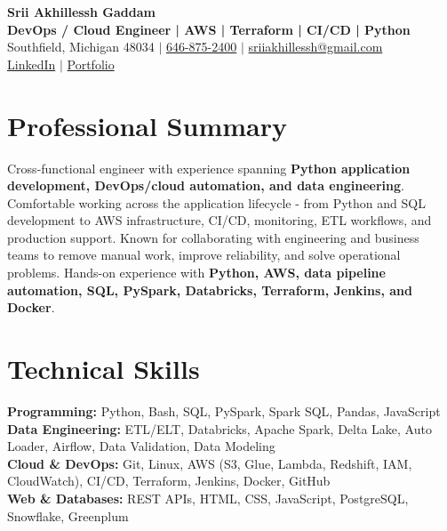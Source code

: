 \documentclass[letterpaper,10pt]{article}
\begin{document}
\fontsize{9.35pt}{10.45pt}\selectfont

\begin{center}
    {\LARGE \textbf{Srii Akhillessh Gaddam}} \\[-1pt]
    \textbf{DevOps / Cloud Engineer | AWS | Terraform | CI/CD | Python} \\[2pt]
    Southfield, Michigan 48034 $|$
    \href{tel:6468752400}{646-875-2400} $|$
    \href{mailto:sriiakhillessh@gmail.com}{sriiakhillessh@gmail.com} \\[1pt]
    \href{https://www.linkedin.com/in/srii-akhiilessh-gaddam-b48668191/}{LinkedIn} $|$
    \href{https://sriiakhillesshg.github.io/portfolio/}{Portfolio}
\end{center}
\vspace{-8pt}

\section{Professional Summary}
\small{Cross-functional engineer with experience spanning \textbf{Python application development, DevOps/cloud automation, and data engineering}. Comfortable working across the application lifecycle - from Python and SQL development to AWS infrastructure, CI/CD, monitoring, ETL workflows, and production support. Known for collaborating with engineering and business teams to remove manual work, improve reliability, and solve operational problems. Hands-on experience with \textbf{Python, AWS, data pipeline automation, SQL, PySpark, Databricks, Terraform, Jenkins, and Docker}.}

\section{Technical Skills}
\small{
\textbf{Programming:} Python, Bash, SQL, PySpark, Spark SQL, Pandas, JavaScript \\
\textbf{Data Engineering:} ETL/ELT, Databricks, Apache Spark, Delta Lake, Auto Loader, Airflow, Data Validation, Data Modeling \\
\textbf{Cloud \& DevOps:} Git, Linux, AWS (S3, Glue, Lambda, Redshift, IAM, CloudWatch), CI/CD, Terraform, Jenkins, Docker, GitHub \\
\textbf{Web \& Databases:} REST APIs, HTML, CSS, JavaScript, PostgreSQL, Snowflake, Greenplum
}
\end{document}
